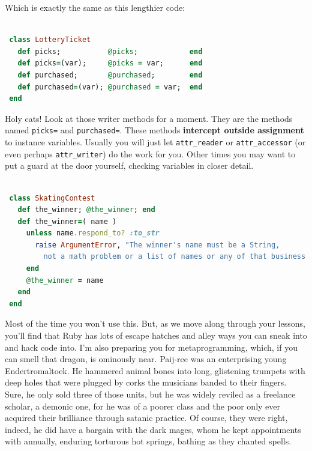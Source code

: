 \documentclass[10pt,twoside]{report}
\begin{document}
Which is exactly the same as this lengthier code:


\begin{lstlisting}[basicstyle=\ttfamily\color{basiccolor},
    commentstyle = \ttfamily\color{commentcolor},
    keywordstyle=\ttfamily\color{keywordscolor},
    stringstyle=\color{stringcolor},
    language=Ruby,
    basicstyle=\small\ttfamily,
    showstringspaces=false,
  ]

 class LotteryTicket
   def picks;           @picks;            end
   def picks=(var);     @picks = var;      end
   def purchased;       @purchased;        end
   def purchased=(var); @purchased = var;  end
 end

\end{lstlisting}


Holy cats!  Look at those writer methods for a moment.  They are the
methods named \lstinline[breaklines=true]|picks=| and
\lstinline[breaklines=true]|purchased=|.  These methods {\bf intercept
  outside assignment} to instance variables. Usually you will just let
\lstinline[breaklines=true]|attr_reader| or
\lstinline[breaklines=true]|attr_accessor| (or even perhaps
\lstinline[breaklines=true]|attr_writer|) do the work for you. Other
times you may want to put a guard at the door yourself, checking
variables in closer detail.


\begin{lstlisting}[basicstyle=\ttfamily\color{basiccolor},
    commentstyle = \ttfamily\color{commentcolor},
    keywordstyle=\ttfamily\color{keywordscolor},
    stringstyle=\color{stringcolor},
    language=Ruby,
    basicstyle=\small\ttfamily,
    showstringspaces=false,
  ]

 class SkatingContest
   def the_winner; @the_winner; end
   def the_winner=( name )
     unless name.respond_to? :to_str
       raise ArgumentError, "The winner's name must be a String,
         not a math problem or a list of names or any of that business."
     end
     @the_winner = name
   end
 end

\end{lstlisting}


Most of the time you won't use this.  But, as we move along through
your lessons, you'll find that Ruby has lots of escape hatches and
alley ways you can sneak into and hack code into.  I'm also preparing
you for metaprogramming, which, if you can smell that dragon, is
ominously near.  Paij-ree was an enterprising young Endertromaltoek.
He hammered animal bones into long, glistening trumpets with deep
holes that were plugged by corks the musicians banded to their
fingers.  Sure, he only sold three of those units, but he was widely
reviled as a freelance scholar, a demonic one, for he was of a poorer
class and the poor only ever acquired their brilliance through satanic
practice.  Of course, they were right, indeed, he did have a bargain
with the dark mages, whom he kept appointments with annually, enduring
torturous hot springs, bathing as they chanted spells.
\end{document}
